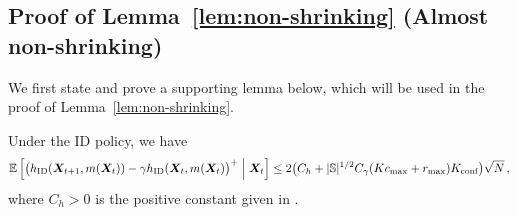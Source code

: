 \subsection{Proof of Lemma~\ref{lem:non-shrinking} (Almost non-shrinking)}

We first state and prove a supporting lemma below, which will be used in the proof of Lemma~\ref{lem:non-shrinking}.

\begin{lemma}\label{lem:focus set drift}
    Under the ID policy, we have 
    \begin{align*}
        \mathbb{E}\left[\big(h_{\textnormal{ID}}({\bm{X}}_{t+1},m({\bm{X}}_t))- \gamma h_{\textnormal{ID}}({\bm{X}}_{t},m({\bm{X}}_t)\big)^+\;\middle|\;{\bm{X}}_t\right]\leq 2\big(C_h+\lvert\mathbb{S}\rvert^{1/2} C_{\gamma}(Kc_{\max}+r_{\max})K_{\text{conf}}\big)\sqrt{N}\,,
    \end{align*}
    where $C_h > 0$ is the positive constant given in . 
\end{lemma}

